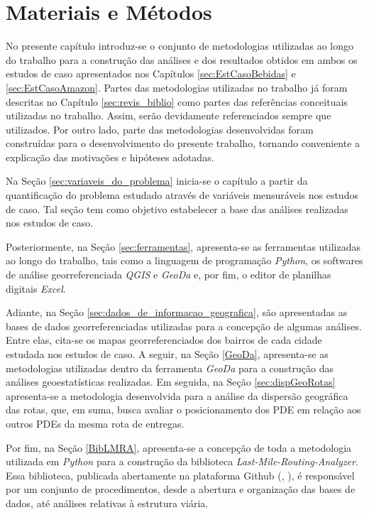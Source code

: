 \chapter{Materiais e Métodos} \label{sec:mat&met}

No presente capítulo introduz-se o conjunto de metodologias utilizadas ao longo do trabalho para a construção das análises e dos resultados obtidos em ambos os estudos de caso apresentados nos Capítulos \ref{sec:EstCasoBebidas} e \ref{sec:EstCasoAmazon}.
Partes das  metodologias utilizadas no trabalho já foram descritas no Capítulo \ref{sec:revis_biblio} como partes das referências conceituais utilizadas no trabalho. Assim, serão devidamente referenciados sempre que utilizados.
Por outro lado, parte das metodologias desenvolvidas foram construídas para o desenvolvimento do presente trabalho, tornando conveniente a explicação das motivações e hipóteses adotadas.

Na Seção \ref{sec:variaveis_do_problema} inicia-se o capítulo a partir da quantificação do problema estudado através de variáveis mensuráveis nos estudos de caso.
Tal seção tem como objetivo estabelecer a base das análises realizadas nos estudos de caso.

Posteriormente, na Seção \ref{sec:ferramentas}, apresenta-se as ferramentas utilizadas ao longo do trabalho, tais como a linguagem de programação \textit{Python}, os softwares de análise georreferenciada \textit{QGIS} e \textit{GeoDa} e, por fim, o editor de planilhas digitais \textit{Excel}.

Adiante, na Seção \ref{sec:dados_de_informacao_geografica}, são apresentadas as bases de dados georreferenciadas utilizadas para a concepção de algumas análises. Entre elas, cita-se os mapas georreferenciados dos bairros de cada cidade estudada nos estudos de caso. A seguir, na Seção \ref{GeoDa}, apresenta-se as metodologias utilizadas dentro da ferramenta \textit{GeoDa} para a construção das análises geoestatísticas realizadas. Em seguida, na Seção \ref{sec:dispGeoRotas} apresenta-se a metodologia desenvolvida para a análise da dispersão geográfica das rotas, que, em suma, busca avaliar o posicionamento dos PDE em relação aos outros PDEs da mesma rota de entregas.

Por fim, na Seção \ref{BibLMRA}, apresenta-se a concepção de toda a metodologia utilizada em \textit{Python} para a construção da biblioteca \textit{Last-Mile-Routing-Analyzer}. Essa biblioteca, publicada abertamente na plataforma Github (, \citeyear{guilherme_fernandes_alves_2022_6792977}), é responsável por um conjunto de procedimentos, desde a abertura e organização das bases de dados, até análises relativas à estrutura viária.

